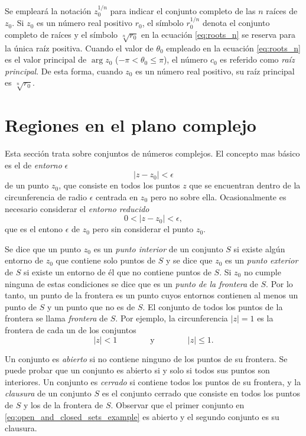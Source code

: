 \documentclass[a4paper]{report}
\begin{document}
Se empleará la notación \(z_0^{1/n}\) para indicar el conjunto completo de las \(n\) raíces de \(z_0\). Si \(z_0\) es un número real positivo \(r_0\), el símbolo \(r_0^{1/n}\) denota el conjunto completo de raíces y el símbolo \(\sqrt[n]{r_0}\) en la ecuación \ref{eq:roots_n} se reserva para la única raíz positiva. Cuando el valor de \(\theta_0\) empleado en la ecuación \ref{eq:roots_n} es el valor principal de \(\arg z_0\) (\(-\pi<\theta_0\leq\pi\)), el número \(c_0\) es referido como \emph{raíz principal}. De esta forma, cuando \(z_0\) es un número real positivo, su raíz principal es \(\sqrt[n]{r_0}\).

\section{Regiones en el plano complejo}\label{sec:complex_plane_regions}

Esta sección trata sobre conjuntos de números complejos. El concepto mas básico es el de \emph{entorno} \(\epsilon\)
\[
 |z-z_0|<\epsilon
\]
de un punto \(z_0\), que consiste en todos los puntos \(z\) que se encuentran dentro de la circunferencia de radio \(\epsilon\) centrada en \(z_0\) pero no sobre ella. Ocasionalmente es necesario considerar el \emph{entorno reducido}
\[
 0<|z-z_0|<\epsilon,
\]
que es el entono \(\epsilon\) de \(z_0\) pero sin considerar el punto \(z_0\).

Se dice que un punto \(z_0\) es un \emph{punto interior} de un conjunto \(S\) si existe algún entorno de \(z_0\) que contiene solo puntos de \(S\) y se dice que \(z_0\) es un \emph{punto exterior} de \(S\) si existe un entorno de él que no contiene puntos de \(S\). Si \(z_0\) no cumple ninguna de estas condiciones se dice que es un \emph{punto de la frontera} de \(S\). Por lo tanto, un punto de la frontera es un punto cuyos entornos contienen al menos un punto de \(S\) y un punto que no es de \(S\). El conjunto de todos los puntos de la frontera se llama \emph{frontera} de \(S\). Por ejemplo, la circunferencia \(|z|=1\) es la frontera de cada un de los conjuntos
\begin{equation}\label{eq:open_and_closed_sets_example}
 |z|<1
 \qquad\qquad\textrm{y}\qquad\qquad
 |z|\leq1.
\end{equation}

Un conjunto es \emph{abierto} si no contiene ninguno de los puntos de su frontera. Se puede probar que un conjunto es abierto si y solo si todos sus puntos son interiores. Un conjunto es \emph{cerrado} si contiene todos los puntos de su frontera, y la \emph{clausura} de un conjunto \(S\) es el conjunto cerrado que consiste en todos los puntos de \(S\) y los de la frontera de \(S\). Observar que el primer conjunto en \ref{eq:open_and_closed_sets_example} es abierto y el segundo conjunto es su clausura.
\end{document}
